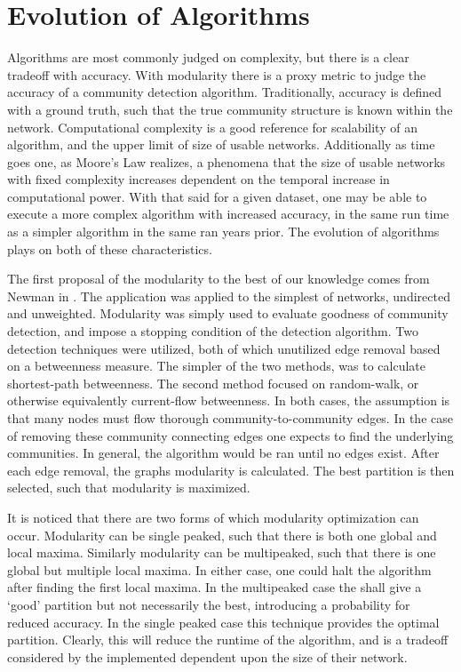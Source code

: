 \documentclass[a4paper, 12pt, twocolumn]{article}
\begin{document}
\section{Evolution of Algorithms}

Algorithms are most commonly judged on complexity, but there is a clear tradeoff with accuracy.
With modularity there is a proxy metric to judge the accuracy of a community detection algorithm.
Traditionally, accuracy is defined with a ground truth, such that the true community structure is known within the network.
Computational complexity is a good reference for scalability of an algorithm, and the upper limit of size of usable networks.
Additionally as time goes one, as Moore's Law realizes, a phenomena that the size of usable networks with fixed complexity increases dependent on the temporal increase in computational power.
With that said for a given dataset, one may be able to execute a more complex algorithm with increased accuracy, in the same run time as a simpler algorithm in the same ran years prior.
The evolution of algorithms plays on both of these characteristics.

The first proposal of the modularity to the best of our knowledge comes from Newman in \cite{finding_and_evaling_comm_struct}.
The application was applied to the simplest of networks, undirected and unweighted.
Modularity was simply used to evaluate goodness of community detection, and impose a stopping condition of the detection algorithm.
Two detection techniques were utilized, both of which unutilized edge removal based on a betweenness measure.
The simpler of the two methods, was to calculate shortest-path betweenness.
The second method focused on random-walk, or otherwise equivalently current-flow betweenness.
In both cases, the assumption is that many nodes must flow thorough community-to-community edges.
In the case of removing these community connecting edges one expects to find the underlying communities.
In general, the algorithm would be ran until no edges exist.
After each edge removal, the graphs modularity is calculated.
The best partition is then selected, such that modularity is maximized.

It is noticed that there are two forms of which modularity optimization can occur.
Modularity can be single peaked, such that there is both one global and local maxima.
Similarly modularity can be multipeaked, such that there is one global but multiple local maxima.
In either case, one could halt the algorithm after finding the first local maxima.
In the multipeaked case the shall give a `good' partition but not necessarily the best, introducing a probability for reduced accuracy.
In the single peaked case this technique provides the optimal partition.
Clearly, this will reduce the runtime of the algorithm, and is a tradeoff considered by the implemented dependent upon the size of their network.
\end{document}
